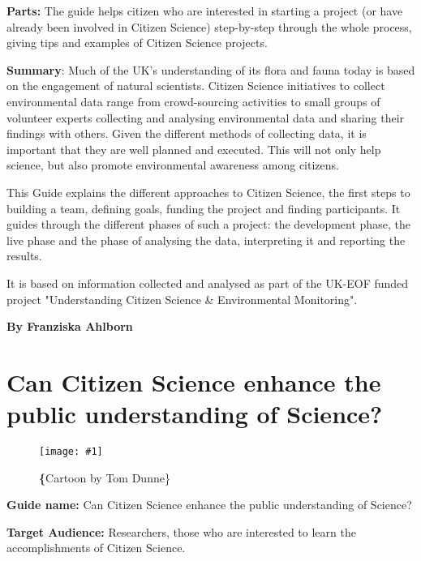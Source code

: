 \documentclass{article}
\newlength{\imgwidth}
\newcommand\scaledgraphics[2]{%
                
\settowidth{\imgwidth}{\texttt{[image: \#1]}}%
                
\setlength{\imgwidth}{\minof{\imgwidth}{#2\textwidth}}%
                
\texttt{[image: \#1]}%
                
}
\begin{document}
\textbf{Parts: }The guide helps citizen who are interested in starting a project (or have already been involved in Citizen Science) step-by-step through the whole process, giving tips and examples of Citizen Science projects.


\textbf{Summary}: Much of the UK's understanding of its flora and fauna today is based on the engagement of natural scientists. Citizen Science initiatives to collect environmental data range from crowd-sourcing activities to small groups of volunteer experts collecting and analysing environmental data and sharing their findings with others. Given the different methods of collecting data, it is important that they are well planned and executed. This will not only help science, but also promote environmental awareness among citizens.


This Guide explains the different approaches to Citizen Science, the first steps to building a team, defining goals, funding the project and finding participants. It guides through the different phases of such a project: the development phase, the live phase and the phase of analysing the data, interpreting it and reporting the results.


It is based on information collected and analysed as part of the UK-EOF funded project "Understanding Citizen Science \& Environmental Monitoring".


\textbf{By Franziska Ahlborn}


\section{Can Citizen Science enhance the public understanding of Science?}\label{H2333653}



\begin{center}
\begin{figure}
\scaledgraphics{fb9872a4-8371-4bfe-a930-f1d621c5649e.png}{0.5}
\caption*{\textbf\{Cartoon by Tom Dunne\}}\label{F26530171}
\end{figure}


\end{center}





\textbf{Guide name: }Can Citizen Science enhance the public understanding of Science?\textbf{ } \autocite{bonney_can_2015}


\textbf{Target Audience: }Researchers, those who are interested to learn the accomplishments of Citizen Science.
\end{document}
